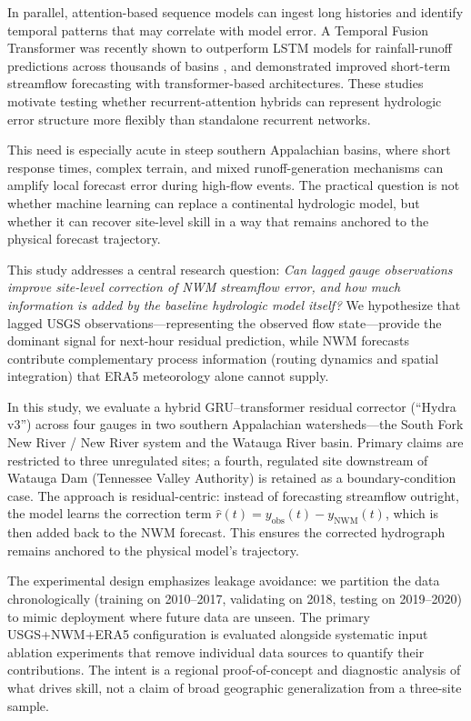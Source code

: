 \documentclass[draft]{agujournal2019}
\begin{document}
In parallel, attention-based sequence models can ingest long histories and identify temporal patterns that may correlate with model error. A Temporal Fusion Transformer was recently shown to outperform LSTM models for rainfall-runoff predictions across thousands of basins \cite{rasiya2023}, and  demonstrated improved short-term streamflow forecasting with transformer-based architectures. These studies motivate testing whether recurrent-attention hybrids can represent hydrologic error structure more flexibly than standalone recurrent networks.

This need is especially acute in steep southern Appalachian basins, where short response times, complex terrain, and mixed runoff-generation mechanisms can amplify local forecast error during high-flow events. The practical question is not whether machine learning can replace a continental hydrologic model, but whether it can recover site-level skill in a way that remains anchored to the physical forecast trajectory.

This study addresses a central research question: \textit{Can lagged gauge observations improve site-level correction of NWM streamflow error, and how much information is added by the baseline hydrologic model itself?} We hypothesize that lagged USGS observations---representing the observed flow state---provide the dominant signal for next-hour residual prediction, while NWM forecasts contribute complementary process information (routing dynamics and spatial integration) that ERA5 meteorology alone cannot supply.

In this study, we evaluate a hybrid GRU--transformer residual corrector (``Hydra v3'') across four gauges in two southern Appalachian watersheds---the South Fork New River / New River system and the Watauga River basin. Primary claims are restricted to three unregulated sites; a fourth, regulated site downstream of Watauga Dam (Tennessee Valley Authority) is retained as a boundary-condition case. The approach is residual-centric: instead of forecasting streamflow outright, the model learns the correction term $\hat{r}(t) = y_{\mathrm{obs}}(t) - y_{\mathrm{NWM}}(t)$, which is then added back to the NWM forecast. This ensures the corrected hydrograph remains anchored to the physical model's trajectory.

The experimental design emphasizes leakage avoidance: we partition the data chronologically (training on 2010--2017, validating on 2018, testing on 2019--2020) to mimic deployment where future data are unseen. The primary USGS+NWM+ERA5 configuration is evaluated alongside systematic input ablation experiments that remove individual data sources to quantify their contributions. The intent is a regional proof-of-concept and diagnostic analysis of what drives skill, not a claim of broad geographic generalization from a three-site sample.
\end{document}
